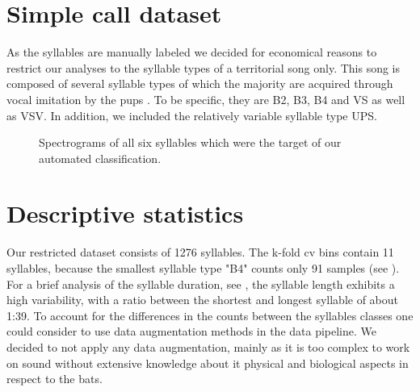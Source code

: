 \section{Simple call dataset}
As the syllables are manually labeled we decided for economical reasons to restrict our analyses to the syllable types of a territorial song only.
This song is composed of several syllable types of which the majority are acquired through vocal imitation by the pups \cite{Knornschild2010}. To be specific, they are B2, B3, B4 and VS as well as VSV. In addition, we included the relatively variable syllable type UPS.


\begin{figure}[ht!]
  \centering
  \caption{Spectrograms of all six syllables which were the target of our automated classification.}
  \label{fig:syllables}
\end{figure}

\section{Descriptive statistics}\label{sec:dataset_descriptive_stats}
Our restricted dataset consists of 1276 syllables. The k-fold \gls{cv} bins contain 11 syllables, because the smallest syllable type "B4" counts only 91 samples (see ).
For a brief analysis of the syllable duration, see , the syllable length exhibits a high variability, with a ratio between the shortest and longest syllable of about 1:39.
To account for the differences in the counts between the syllables classes one could consider to use data augmentation methods in the data pipeline. We decided to not apply any data augmentation, mainly as it is too complex to work on sound without extensive knowledge about it physical and biological aspects in respect to the bats.

